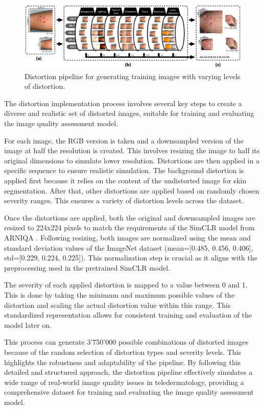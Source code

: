 \begin{figure}[ht]
    \centering
    \includegraphics[keepaspectratio,width=15cm]{img/Distortion_pipeline.jpg}
    \caption{Distortion pipeline for generating training images with varying levels of distortion.}
    \label{fig:DistPipeline}
\end{figure}

The distortion implementation process involves several key steps to create a diverse and realistic set of distorted images, suitable for training and evaluating the image quality assessment model. \par
\vspace{\baselineskip}
\noindent
For each image, the RGB version is taken and a downsampled version of the image at half the resolution is created. This involves resizing the image to half its original dimensions to simulate lower resolution. Distortions are then applied in a specific sequence to ensure realistic simulation. The background distortion is applied first because it relies on the content of the undistorted image for skin segmentation. After that, other distortions are applied based on randomly chosen severity ranges. This ensures a variety of distortion levels across the dataset. \par
\vspace{\baselineskip}
\noindent
Once the distortions are applied, both the original and downsampled images are resized to 224x224 pixels to match the requirements of the SimCLR model from ARNIQA \autocite{ARNIQA}. Following resizing, both images are normalized using the mean and standard deviation values of the ImageNet dataset (mean=[0.485, 0.456, 0.406], std=[0.229, 0.224, 0.225]). This normalization step is crucial as it aligns with the preprocessing used in the pretrained SimCLR model. \par
\vspace{\baselineskip}
\noindent
The severity of each applied distortion is mapped to a value between 0 and 1. This is done by taking the minimum and maximum possible values of the distortion and scaling the actual distortion value within this range. This standardized representation allows for consistent training and evaluation of the model later on. \par
\vspace{\baselineskip}
\noindent
This process can generate 3'750'000 possible combinations of distorted images because of the random selection of distortion types and severity levels. This highlights the robustness and adaptability of the pipeline. By following this detailed and structured approach, the distortion pipeline effectively simulates a wide range of real-world image quality issues in teledermatology, providing a comprehensive dataset for training and evaluating the image quality assessment model. \par

